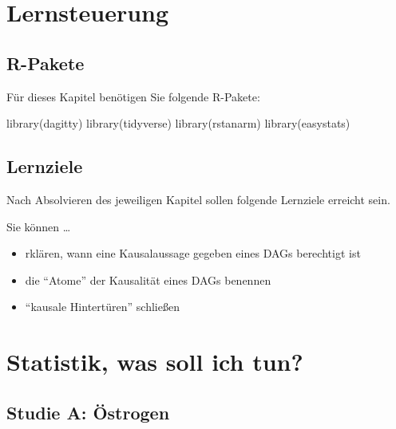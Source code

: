 \documentclass[
  a4paper,
  DIV=11]{scrreprt}
\newenvironment{Shaded}{\begin{snugshade}}{\end{snugshade}}
\newcommand{\FunctionTok}[1]{\textcolor[rgb]{0.28,0.35,0.67}{#1}}
\newcommand{\NormalTok}[1]{\textcolor[rgb]{0.00,0.23,0.31}{#1}}
\providecommand{\tightlist}{%
  \setlength{\itemsep}{0pt}\setlength{\parskip}{0pt}}\usepackage{longtable,booktabs,array}
\theoremstyle{definition}
\theoremstyle{remark}
\begin{document}
\hypertarget{lernsteuerung-9}{%
\section{Lernsteuerung}\label{lernsteuerung-9}}

\hypertarget{r-pakete-1}{%
\subsection{R-Pakete}\label{r-pakete-1}}

Für dieses Kapitel benötigen Sie folgende R-Pakete:

\begin{Shaded}
\begin{Highlighting}[]
\FunctionTok{library}\NormalTok{(dagitty)}
\FunctionTok{library}\NormalTok{(tidyverse)}
\FunctionTok{library}\NormalTok{(rstanarm)}
\FunctionTok{library}\NormalTok{(easystats)}
\end{Highlighting}
\end{Shaded}

\hypertarget{lernziele-10}{%
\subsection{Lernziele}\label{lernziele-10}}

Nach Absolvieren des jeweiligen Kapitel sollen folgende Lernziele
erreicht sein.

Sie können \ldots{}

\begin{itemize}
\tightlist
\item
  rklären, wann eine Kausalaussage gegeben eines DAGs berechtigt ist
\item
  die ``Atome'' der Kausalität eines DAGs benennen
\item
  ``kausale Hintertüren'' schließen
\end{itemize}

\hypertarget{statistik-was-soll-ich-tun}{%
\section{Statistik, was soll ich
tun?}\label{statistik-was-soll-ich-tun}}

\hypertarget{studie-a-uxf6strogen}{%
\subsection{Studie A: Östrogen}\label{studie-a-uxf6strogen}}
\end{document}
